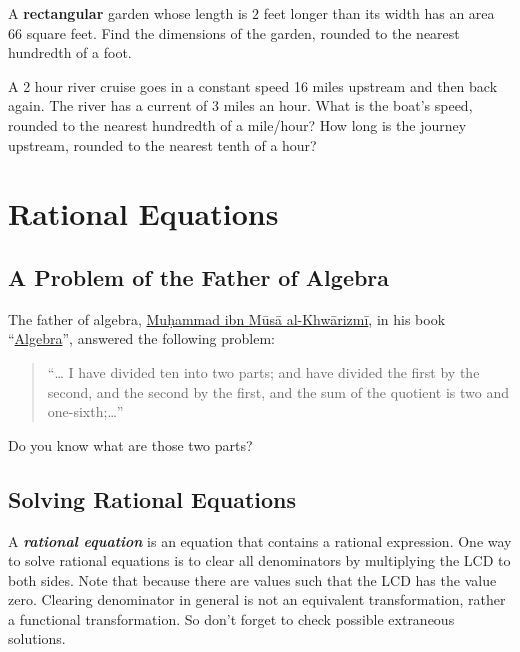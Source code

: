 \documentclass[en,12pt]{elegantbook}
\let\BeginKnitrBlock\begin \let\EndKnitrBlock\end
\begin{document}
\BeginKnitrBlock{exercise}
\protect\hypertarget{exr:unnamed-chunk-163}{}{\label{exr:unnamed-chunk-163} }
A \textbf{rectangular} garden whose length is \(2\) feet longer than its width has an area 66 square feet. Find the dimensions of the garden, rounded to the nearest hundredth of a foot.
\EndKnitrBlock{exercise}

\BeginKnitrBlock{exercise}
\protect\hypertarget{exr:unnamed-chunk-164}{}{\label{exr:unnamed-chunk-164} }
A 2 hour river cruise goes in a constant speed 16 miles upstream and then back again. The river has a current of 3 miles an hour. What is the boat's speed, rounded to the nearest hundredth of a mile/hour? How long is the journey upstream, rounded to the nearest tenth of a hour?
\EndKnitrBlock{exercise}

\hypertarget{rational-equations}{%
\chapter{Rational Equations}\label{rational-equations}}

\hypertarget{a-problem-of-the-father-of-algebra}{%
\section{A Problem of the Father of Algebra}\label{a-problem-of-the-father-of-algebra}}

\BeginKnitrBlock{rmdthink}
The father of algebra, \href{https://en.wikipedia.org/wiki/Muhammad_ibn_Musa_al-Khwarizmi\#Algebra}{Muḥammad ibn Mūsā al-Khwārizmī}, in his book ``\href{https://archive.org/details/algebraofmohamme00khuwrich/page/44/mode/2up}{Algebra}'', answered the following problem:

\begin{quote}
``\ldots{} I have divided ten into two parts; and have divided the first by the second, and the second by the first, and the sum of the quotient is two and one-sixth;\ldots{}''
\end{quote}

Do you know what are those two parts?
\EndKnitrBlock{rmdthink}

\hypertarget{solving-rational-equations}{%
\section{Solving Rational Equations}\label{solving-rational-equations}}

A \textbf{\emph{rational equation}} is an equation that contains a rational expression. One way to solve rational equations is to clear all denominators by multiplying the LCD to both sides. Note that because there are values such that the LCD has the value zero. Clearing denominator in general is not an equivalent transformation, rather a functional transformation. So don't forget to check possible extraneous solutions.
\end{document}
